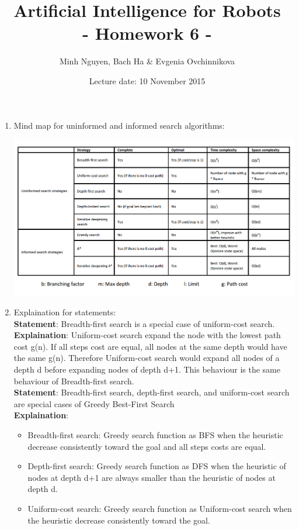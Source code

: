 \documentclass[a4paper, 12pt]{article}
\title{Artificial Intelligence for Robots \\
				- Homework 6 -}
\author{Minh Nguyen, Bach Ha \& Evgenia Ovchinnikova}
\date{Lecture date: 10 November 2015}
\begin{document}
\maketitle

    \begin{enumerate}

    \item Mind map for uninformed and informed search algorithms:
    
    \includegraphics[scale=0.4]{Uninformedandinformedsearch.png} 
    
    \item Explaination for statements:\vspace{0.5cm}\\
    \textbf{Statement}: Breadth-first search is a special case of uniform-cost search.\\
    \textbf{Explaination}: Uniform-cost search expand the node with the lowest path cost g(n). If all steps cost are equal, all nodes at the same depth would have the same g(n). Therefore Uniform-cost search would expand all nodes of a depth d before expanding nodes of depth d+1. This behaviour is the same behaviour of Breadth-first search.\\
	
	\textbf{Statement}: Breadth-first search, depth-first search, and uniform-cost search are special cases of Greedy Best-First Search\\
	\textbf{Explaination}:
	\begin{itemize}
		\item Breadth-first search: Greedy search function as BFS when the heuristic decrease consistently toward the goal and all steps costs are equal.
		\item Depth-first search: Greedy search function as DFS when the heuristic of nodes at depth d+1 are always smaller than the heuristic of nodes at depth d.
		\item Uniform-cost search: Greedy search function as Uniform-cost search when the heuristic decrease consistently toward the goal.
	\end{itemize}
	

\end{enumerate}
\end{document}
